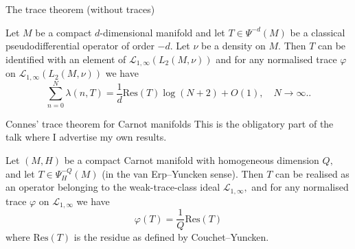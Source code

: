 \documentclass{beamer}
\numberwithin{equation}{section}
\theoremstyle{plain}
\theoremstyle{plain}
\theoremstyle{definition}
\theoremstyle{plain}
\theoremstyle{plain}
\theoremstyle{definition}
\newcommand{\Lc}{\mathcal{L}}
\begin{document}
\begin{frame}{The trace theorem (without traces)}
    \begin{theorem}\label{ctt_original}
        Let $M$ be a compact $d$-dimensional manifold and let $T\in \Psi^{-d}(M)$ be a classical pseudodifferential operator of order $-d.$ Let $\nu$ be a density on $M.$
        Then $T$ can be identified with an element of $\Lc_{1,\infty}(L_2(M,\nu))$ and for any normalised trace $\varphi$ on $\Lc_{1,\infty}(L_2(M,\nu))$ we have
        \[
            \sum_{n=0}^N \lambda(n,T) = \frac{1}{d}\mathrm{Res}(T)\log(N+2)+O(1),\quad N\to\infty..
        \]
    \end{theorem}
\end{frame}

\begin{frame}{Connes' trace theorem for Carnot manifolds}
    This is the obligatory part of the talk where I advertise my own results.
    \begin{theorem}
        Let $(M,H)$ be a compact Carnot manifold with homogeneous dimension $Q,$ and let $T \in \Psi^{-Q}_H(M)$ (in the van Erp--Yuncken sense). Then $T$ can be realised as an operator belonging to the weak-trace-class ideal $\Lc_{1,\infty},$ and for any normalised trace $\varphi$ on $\Lc_{1,\infty}$ we have
        \[
            \varphi(T) = \frac1Q\mathrm{Res}(T)
        \]
        where $\mathrm{Res}(T)$ is the residue as defined by Couchet--Yuncken.
    \end{theorem}
\end{frame}

\begin{frame}
\end{frame}
\end{document}
